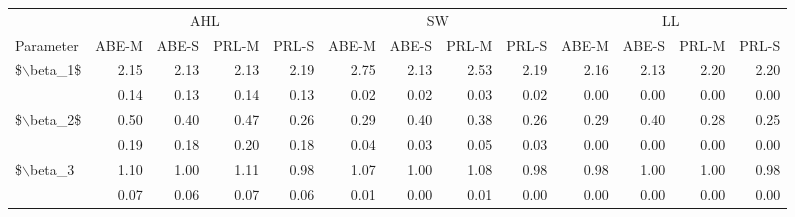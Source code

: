 \begin{tabular}{lrrrrrrrrrrrr}
  \hline
  & \multicolumn{4}{c}{AHL} & \multicolumn{4}{c}{SW} & \multicolumn{4}{c}{LL} \\

                             \cmidrule(lr){2-5}\cmidrule(lr){6-9}\cmidrule(lr){10-13} Parameter& ABE-M & ABE-S & PRL-M & PRL-S& ABE-M & ABE-S & PRL-M & PRL-S& ABE-M & ABE-S & PRL-M & PRL-S\\
 \hline
\$$\backslash$beta\_1\$ & 2.15 & 2.13 & 2.13 & 2.19 & 2.75 & 2.13 & 2.53 & 2.19 & 2.16 & 2.13 & 2.20 & 2.20 \\ 
   & 0.14 & 0.13 & 0.14 & 0.13 & 0.02 & 0.02 & 0.03 & 0.02 & 0.00 & 0.00 & 0.00 & 0.00 \\ 
  \$$\backslash$beta\_2\$ & 0.50 & 0.40 & 0.47 & 0.26 & 0.29 & 0.40 & 0.38 & 0.26 & 0.29 & 0.40 & 0.28 & 0.25 \\ 
   & 0.19 & 0.18 & 0.20 & 0.18 & 0.04 & 0.03 & 0.05 & 0.03 & 0.00 & 0.00 & 0.00 & 0.00 \\ 
  \$$\backslash$beta\_3 & 1.10 & 1.00 & 1.11 & 0.98 & 1.07 & 1.00 & 1.08 & 0.98 & 0.98 & 1.00 & 1.00 & 0.98 \\ 
   & 0.07 & 0.06 & 0.07 & 0.06 & 0.01 & 0.00 & 0.01 & 0.00 & 0.00 & 0.00 & 0.00 & 0.00 \\ 
   \hline
\end{tabular}
